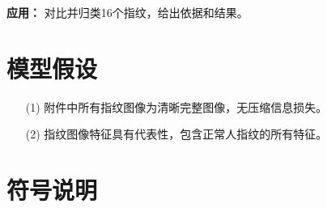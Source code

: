 \documentclass{whutmod}
\begin{document}
            \textbf{应用：} 对比并归类16个指纹，给出依据和结果。

    \section{模型假设}
        \begin{itemize}
            \item[(1)] 附件中所有指纹图像为清晰完整图像，无压缩信息损失。
            \item[(2)] 指纹图像特征具有代表性，包含正常人指纹的所有特征。
        \end{itemize}

    \section{符号说明}
\end{document}
